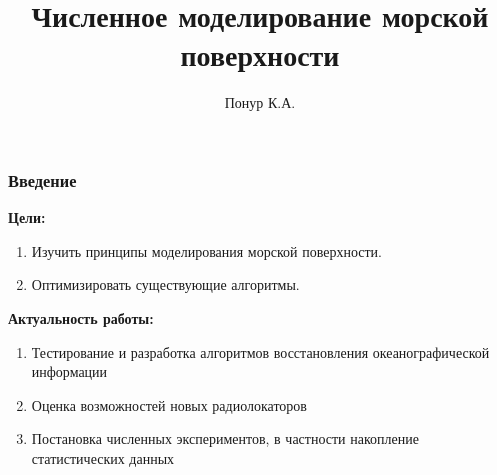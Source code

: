 \documentclass[10pt,pdf,hyperref={unicode}, dvipsnames]{beamer}
\begin{document}
\title[Моделирование морской поверхности]{Численное моделирование морской поверхности}

\author{Понур К.А.}




\begin{frame}[t]
	\frametitle{Введение}
	\vfill
	\textbf{Цели: }\\
		\begin{enumerate}
			\item Изучить принципы моделирования морской поверхности.

			\item Оптимизировать существующие алгоритмы.


		\end{enumerate}
		\vfill

	\textbf{Актуальность работы: }

	\begin{enumerate}
		\item Тестирование и разработка алгоритмов восстановления океанографической информации
		\item Оценка возможностей новых радиолокаторов
		\item Постановка численных экспериментов, в частности накопление статистических данных
	\end{enumerate}
	\vfill
\end{frame}

\end{document}
